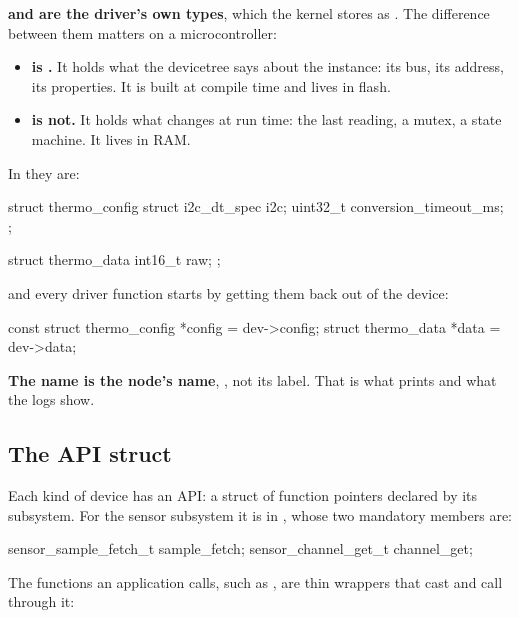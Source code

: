 \noindent \textbf{ and  are the driver’s own types}, which the kernel stores
as . The difference between them matters on a microcontroller:

\begin{itemize}
  \item \textbf{ is .} It holds what the devicetree says about the instance: its
    bus, its address, its properties. It is built at compile time and lives in flash.
  \item \textbf{ is not.} It holds what changes at run time: the last reading, a mutex, a state
    machine. It lives in RAM.
\end{itemize}

In  they are:

\begin{ccode}
struct thermo_config {
	struct i2c_dt_spec i2c;
	uint32_t conversion_timeout_ms;
};

struct thermo_data {
	int16_t raw;
};
\end{ccode}

\noindent and every driver function starts by getting them back out of the device:

\begin{ccode}
const struct thermo_config *config = dev->config;
struct thermo_data *data = dev->data;
\end{ccode}

\noindent \textbf{The name is the node’s name}, , not its label. That is what
 prints and what the logs show.

\subsection{The API struct}
Each kind of device has an API: a struct of function pointers declared by its subsystem. For the
sensor subsystem it is  in , whose
two mandatory members are:

\begin{ccode}
sensor_sample_fetch_t sample_fetch;
sensor_channel_get_t channel_get;
\end{ccode}

\noindent The functions an application calls, such as , are thin
wrappers that cast  and call through it:

